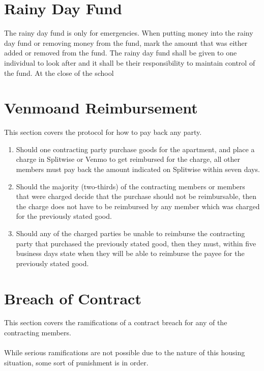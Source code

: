 \documentclass[10pt]{article}
\begin{document}
\section{Rainy Day Fund} \label{Rainy Day Fund}
The rainy day fund is only for emergencies. When putting money into the rainy day fund or removing money from the fund, mark the amount that was either added or removed from the fund. The rainy day fund shall be given to one individual to look after and it shall be their responsibility to maintain control of the fund. At the close of the school

\section{Venmo\textsuperscript{\textregistered}\space and Reimbursement} \label{Venmo and Reinbursement}
This section covers the protocol for how to pay back any party.
\begin{enumerate}
	\item Should one contracting party purchase goods for the apartment, and place a charge in Splitwise\textsuperscript{\textregistered} or Venmo\textsuperscript{\textregistered} to get reimbursed for the charge, all other members must pay back the amount indicated on Splitwise\textsuperscript{\textregistered} within seven days.
	\item Should the majority (two-thirds) of the contracting members or members that were charged decide that the purchase should not be reimbursable, then the charge does not have to be reimbursed by any member which was charged for the previously stated good.
	\item Should any of the charged parties be unable to reimburse the contracting party that purchased the previously stated good, then they must, within five business days state when they will be able to reimburse the payee for the previously stated good.
	
\end{enumerate}

\section{Breach of Contract} \label{Breach of Contract}
This section covers the ramifications of a contract breach for any of the contracting members.
\\\\
While serious ramifications are not possible due to the nature of this housing situation, some sort of punishment is in order.
\end{document}
